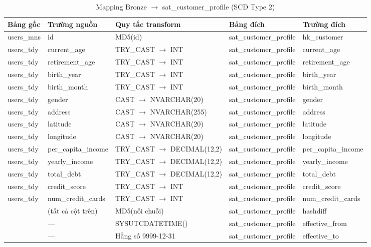 \begin{table}[H]
\centering
\footnotesize

\begin{tabular}{lllll}
\hline
\textbf{Bảng gốc} & \textbf{Trường nguồn} & \textbf{Quy tắc transform} & \textbf{Bảng đích} & \textbf{Trường đích} \\
\hline
users\_mns   & id                 & MD5(id)                  & sat\_customer\_profile & hk\_customer        \\
users\_tdy   & current\_age       & TRY\_CAST $\rightarrow$ INT          & sat\_customer\_profile & current\_age        \\
users\_tdy   & retirement\_age    & TRY\_CAST $\rightarrow$ INT          & sat\_customer\_profile & retirement\_age     \\
users\_tdy   & birth\_year        & TRY\_CAST $\rightarrow$ INT          & sat\_customer\_profile & birth\_year         \\
users\_tdy   & birth\_month       & TRY\_CAST $\rightarrow$ INT          & sat\_customer\_profile & birth\_month        \\
users\_tdy   & gender             & CAST $\rightarrow$ NVARCHAR(20)      & sat\_customer\_profile & gender              \\
users\_tdy   & address            & CAST $\rightarrow$ NVARCHAR(255)     & sat\_customer\_profile & address             \\
users\_tdy   & latitude           & CAST $\rightarrow$ NVARCHAR(20)      & sat\_customer\_profile & latitude            \\
users\_tdy   & longitude          & CAST $\rightarrow$ NVARCHAR(20)      & sat\_customer\_profile & longitude           \\
users\_tdy   & per\_capita\_income & TRY\_CAST $\rightarrow$ DECIMAL(12,2) & sat\_customer\_profile & per\_capita\_income \\
users\_tdy   & yearly\_income     & TRY\_CAST $\rightarrow$ DECIMAL(12,2) & sat\_customer\_profile & yearly\_income      \\
users\_tdy   & total\_debt        & TRY\_CAST $\rightarrow$ DECIMAL(12,2) & sat\_customer\_profile & total\_debt         \\
users\_tdy   & credit\_score      & TRY\_CAST $\rightarrow$ INT          & sat\_customer\_profile & credit\_score       \\
users\_tdy   & num\_credit\_cards & TRY\_CAST $\rightarrow$ INT          & sat\_customer\_profile & num\_credit\_cards  \\
             & (tất cả cột trên) & MD5(nối chuỗi)           & sat\_customer\_profile & hashdiff            \\
             & —                 & SYSUTCDATETIME()         & sat\_customer\_profile & effective\_from     \\
             & —                 & Hằng số 9999-12-31       & sat\_customer\_profile & effective\_to       \\
\hline
\end{tabular}
\caption{Mapping Bronze $\rightarrow$ sat\_customer\_profile (SCD Type 2)}
\end{table}

